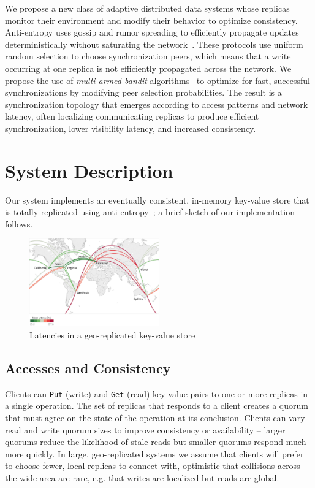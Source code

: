 We propose a new class of adaptive distributed data systems whose replicas
monitor their environment and modify their behavior to optimize consistency.
Anti-entropy uses gossip and rumor spreading to efficiently propagate updates
deterministically without saturating the
network~\cite{haeupler_simple_2015,karp_randomized_2000,moreno_dynamics_2004}.
These protocols use uniform random selection to choose synchronization peers,
which means that a write occurring at one replica is not efficiently
propagated across the network.
We propose the use of \textit{multi-armed bandit}
algorithms~\cite{langford_epoch-greedy_2008,luo_efficient_2017} to optimize
for fast, successful synchronizations by modifying peer selection
probabilities.
The result is a synchronization topology that emerges according to access
patterns and network latency, often localizing communicating replicas to
produce efficient synchronization, lower visibility latency, and increased
consistency.

\section*{System Description}

Our system implements an eventually consistent, in-memory key-value store
that is totally replicated using anti-entropy~\cite{decandia_dynamo:_2007};
a brief sketch of our implementation follows.

\begin{figure}[h]
    \centering
    \includegraphics[width=0.5\textwidth]{figures/network}
    \caption{Latencies in a geo-replicated key-value store}
    \label{fig:network}
\end{figure}

\subsection*{Accesses and Consistency}

Clients can \texttt{Put} (write) and \texttt{Get} (read) key-value pairs to
one or more replicas in a single operation.
The set of replicas that responds to a client creates a quorum that must
agree on the state of the operation at its conclusion.
Clients can vary read and write quorum sizes to improve consistency or
availability -- larger quorums reduce the likelihood of stale reads but
smaller quorums respond much more quickly.
In large, geo-replicated systems we assume that clients will prefer to choose
fewer, local replicas to connect with, optimistic that collisions across the
wide-area are rare, e.g. that writes are localized but reads are global.

